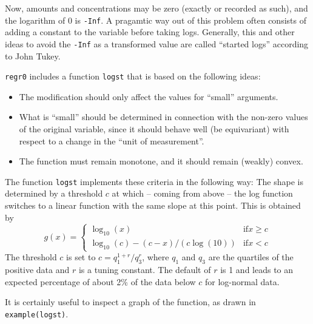 \documentclass{article}
\begin{document}
Now, amounts and concentrations may be zero (exactly or recorded as such),
and the logarithm of 0 is \texttt{-Inf}. 
A pragamtic way out of this problem often consists of adding a constant
to the variable before taking logs. 
Generally, this and other ideas to avoid the \texttt{-Inf} as a transformed
value are called ``started logs'' according to John Tukey.

\texttt{regr0} includes a function \texttt{logst} that is based on the
following ideas:
\begin{itemize}
\item 
The modification should only affect the values for ``small'' arguments.
\item
What is ``small'' should be determined in connection with the non-zero 
values of the original variable, since it should behave well (be
equivariant) with respect to a change in the ``unit of measurement''.
\item
The function must remain monotone, and it should remain (weakly) convex.
\end{itemize}

The function \texttt{logst} implements these criteria in the following way: 
The shape is determined by a threshold $c$ at which -- coming from above --
the log function switches to a linear function with the same slope at this
point. This is obtained by
$$
  g(x) = \left\{\begin{array}{ll}\log_{10}(x) & \mbox{if} x\ge c\\
         \log_{10}(c) - (c-x)/(c\log(10)) & \mbox{if} x< c
         \end{array}\right.
$$
The threshold $c$ is set to
$ c = q_1^{1+r}/q_3^r$, where $q_1$ and $q_3$ are the quartiles of the 
positive data and $r$ is a tuning constant. 
The default of $r$ is 1 and leads to an expected
percentage of about 2\% of the data below $c$ for log-normal data.

It is certainly useful to inspect a graph of the function, as drawn in 
\texttt{example(logst)}.
\end{document}
